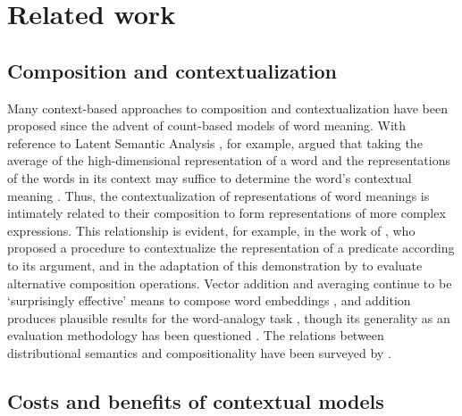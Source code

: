 \section{Related work}
\label{sec:related-work}

\subsection{Composition and contextualization}

Many context-based approaches to composition and contextualization have been proposed
since the advent of count-based models of word meaning.
With reference to Latent Semantic Analysis \parencites{Deerwester1990}, for example,
\citeauthor{Landauer1997} argued that taking the average of the high-dimensional
representation of a word and the representations of the words in its context may
suffice to determine the word's contextual meaning \parencites*[229-230]{Landauer1997}.
Thus, the contextualization of representations of word meanings is intimately related
to their composition to form representations of more complex expressions.
This relationship is evident, for example, in the work of \textcites{Kintsch2001}, who
proposed a procedure to contextualize the representation of a predicate according to
its argument, and in the adaptation of this demonstration by \textcites{Mitchell2008}
to evaluate alternative composition operations.
Vector addition and averaging continue to be `surprisingly effective' means to compose
word embeddings \parencites[10]{Boleda2020}, and addition produces plausible results
for the word-analogy task \parencites[9]{Mikolov2013}[7]{Mikolov2013a}, though its
generality as an evaluation methodology has been questioned
\parencites[1300]{Lenci2022}.
The relations between distributional semantics and compositionality have been surveyed
by \textcites{Erk2012}{Clark2015}{Boleda2016}.

\subsection{Costs and benefits of contextual models}


